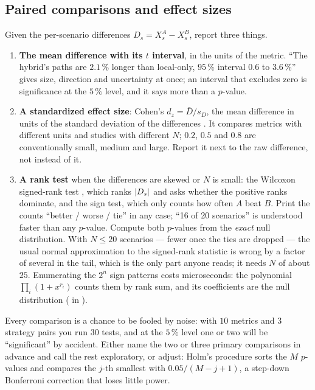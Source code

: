 \subsection{Paired comparisons and effect sizes}

Given the per-scenario differences $D_s = X^A_s - X^B_s$, report three
things.
\begin{enumerate}
  \item \textbf{The mean difference with its $t$ interval}, in the units of
        the metric. ``The hybrid's paths are $2.1\,\%$ longer than
        local-only, $95\,\%$ interval $0.6$ to $3.6\,\%$'' gives size,
        direction and uncertainty at once; an interval that excludes zero is
        significance at the $5\,\%$ level, and it says more than a
        $p$-value.
  \item \textbf{A standardized effect size}: Cohen's
        $d_z = \bar D / s_D$, the mean difference in units of the standard
        deviation of the differences \cite{cohen1988power}. It compares
        metrics with different units and studies with different $N$;
        $0.2$, $0.5$ and $0.8$ are conventionally small, medium and large.
        Report it next to the raw difference, not instead of it.
  \item \textbf{A rank test} when the differences are skewed or $N$ is
        small: the Wilcoxon signed-rank test \cite{wilcoxon1945individual},
        which ranks $\left\lvert D_s \right\rvert$ and asks whether the positive ranks
        dominate, and the sign test, which only counts how often $A$ beat
        $B$. Print the counts ``better / worse / tie'' in any case; ``16 of
        20 scenarios'' is understood faster than any $p$-value. Compute both
        $p$-values from the \emph{exact} null distribution. With $N \le 20$
        scenarios --- fewer once the ties are dropped --- the usual normal
        approximation to the signed-rank statistic is wrong by a factor of
        several in the tail, which is the only part anyone reads; it needs
        $N$ of about $25$. Enumerating the $2^n$ sign patterns costs
        microseconds: the polynomial $\prod_i (1 + x^{r_i})$ counts them by
        rank sum, and its coefficients are the null distribution
        ( in ).
\end{enumerate}
Every comparison is a chance to be fooled by noise: with $10$ metrics and
$3$ strategy pairs you run $30$ tests, and at the $5\,\%$ level one or two
will be ``significant'' by accident. Either name the two or three primary
comparisons in advance and call the rest exploratory, or adjust: Holm's
procedure \cite{holm1979simple} sorts the $M$ $p$-values and compares the
$j$-th smallest with $0.05/(M-j+1)$, a step-down Bonferroni correction that
loses little power.


